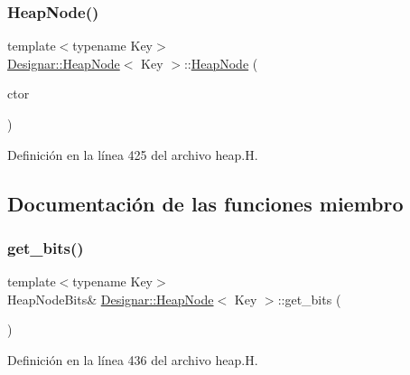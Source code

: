 \subsubsection{\texorpdfstring{Heap\+Node()}{HeapNode()}\hspace{0.1cm}{\footnotesize\ttfamily [4/4]}}
{\footnotesize\ttfamily template$<$typename Key$>$ \\
\hyperlink{class_designar_1_1_heap_node}{Designar\+::\+Heap\+Node}$<$ Key $>$\+::\hyperlink{class_designar_1_1_heap_node}{Heap\+Node} (\begin{DoxyParamCaption}\item[{\hyperlink{namespace_designar_a679bc99fd69a3601faa5d6d47f865106}{Bin\+Tree\+Node\+Ctor}}]{ctor }\end{DoxyParamCaption})\hspace{0.3cm}{\ttfamily [inline]}}



Definición en la línea 425 del archivo heap.\+H.



\subsection{Documentación de las funciones miembro}
\mbox{\label{class_designar_1_1_heap_node_a9fc6866e2550f415ec407b1c85ca54ab}} 
\subsubsection{\texorpdfstring{get\+\_\+bits()}{get\_bits()}}
{\footnotesize\ttfamily template$<$typename Key$>$ \\
Heap\+Node\+Bits\& \hyperlink{class_designar_1_1_heap_node}{Designar\+::\+Heap\+Node}$<$ Key $>$\+::get\+\_\+bits (\begin{DoxyParamCaption}{ }\end{DoxyParamCaption})\hspace{0.3cm}{\ttfamily [inline]}}



Definición en la línea 436 del archivo heap.\+H.

\mbox{\label{class_designar_1_1_heap_node_aacf1d59ac7645a1fe6479f93957dc1be}} 
